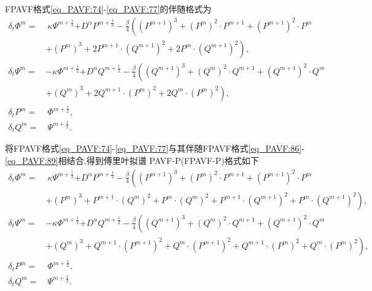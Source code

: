 FPAVF格式\eqref{eq_PAVF:74}-\eqref{eq_PAVF:77}的伴随格式为
\begin{align}
\delta_{t} \varPhi^{m}=&~\kappa \Psi^{m+\frac{1}{2}}{+D^{\alpha} P^{m+\frac{1}{2}}}-\frac{\beta}{4}\left( (P^{m+1})^3+ (P^{m})^{2}\cdot P^{m+1}+(P^{m+1})^{2}\cdot P^{m}\right.\nonumber\\
	&\left.+ (P^{m})^{3}+2 P^{m+1}\cdot (Q^{m+1})^{2}+2 P^{m}\cdot (Q^{m+1})^{2}\right),\label{eq_PAVF:86}\\
\delta_{t} \Psi^{m}=&-\kappa \varPhi^{m+\frac{1}{2}}{+D^{\alpha} Q^{m+\frac{1}{2}}}-\frac{\beta}{4}\left( (Q^{m+1})^3+ (Q^{m})^{2}\cdot Q^{m+1}+ (Q^{m+1})^{2}\cdot Q^{m}\right.\nonumber\\
	&\left.+ (Q^{m})^{3}+2 Q^{m+1}\cdot (P^{m})^{2}+2 Q^{m}\cdot (P^{m})^{2}\right),\label{eq_PAVF:87}\\
\delta_{t} P^{m}=&~\varPhi^{m+\frac{1}{2}},\label{eq_PAVF:88}\\
\delta_{t} Q^{m}=&~\Psi^{m+\frac{1}{2}}.\label{eq_PAVF:89}
\end{align}

将FPAVF格式\eqref{eq_PAVF:74}-\eqref{eq_PAVF:77}与其伴随FPAVF格式\eqref{eq_PAVF:86}-\eqref{eq_PAVF:89}相结合,得到傅里叶拟谱 PAVF-P(FPAVF-P)格式如下
\begin{align}
\delta_{t} \varPhi^{m}=&~\kappa \Psi^{m+\frac{1}{2}}{+D^{\alpha} P^{m+\frac{1}{2}}}-\frac{\beta}{4}\left((P^{m+1})^3+(P^{m})^{2}\cdot P^{m+1}+(P^{m+1})^{2}\cdot P^{m}\right.\nonumber\\
	&\left.+(P^{m})^{3}+P^{m+1}\cdot (Q^{m})^{2}+P^{m}\cdot (Q^{m})^{2}+P^{m+1}\cdot (Q^{m+1})^{2}+P^{m}\cdot (Q^{m+1})^{2}\right),\label{eq_PAVF:98}\\
\delta_{t} \Psi^{m}=&-\kappa \varPhi^{m+\frac{1}{2}}{+D^{\alpha} Q^{m+\frac{1}{2}}}-\frac{\beta}{4}\left((Q^{m+1})^3+(Q^{m})^{2}\cdot Q^{m+1}+(Q^{m+1})^{2}\cdot Q^{m}\right.\nonumber\\
	&\left.+(Q^{m})^{3}+Q^{m+1}\cdot (P^{m+1})^{2}+Q^{m}\cdot (P^{m+1})^{2}+Q^{m+1}\cdot (P^{m})^{2}+Q^{m}\cdot (P^{m})^{2}\right),\label{eq_PAVF:99}\\
\delta_{t} P^{m}=&~\varPhi^{m+\frac{1}{2}},\label{eq_PAVF:100}\\
\delta_{t} Q^{m}=&~\Psi^{m+\frac{1}{2}}.\label{eq_PAVF:101}
\end{align}

